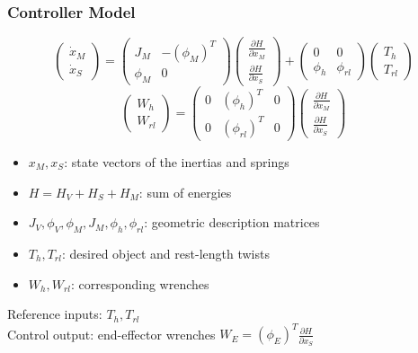 \documentclass[student]{ITRslides}
\begin{document}
\begin{frame}
	\frametitle{Controller Model} \[
	\begin{pmatrix}	\dot{x}_M \\ \dot{x}_S\end{pmatrix} = 
	\begin{pmatrix}J_M & -(\phi_M)^T\\ \phi_M & 0 \end{pmatrix} 
	\begin{pmatrix}\frac{\partial H}{\partial x_M} \\ \frac{\partial H}{\partial x_S}\end{pmatrix}
	+ \begin{pmatrix} 0 & 0 \\ \phi_h & \phi_{rl} \end{pmatrix}
	\begin{pmatrix}
	T_h \\ T_{rl}
	\end{pmatrix}\]
	\[\begin{pmatrix} W_h \\ W_{rl} \end{pmatrix} = 
	\begin{pmatrix}0 & (\phi_h)^T & 0 \\ 0 & (\phi_{rl})^T & 0
\end{pmatrix}\begin{pmatrix}\frac{\partial H}{\partial x_M}\\\frac{\partial H}{\partial x_S}\end{pmatrix} \]
\begin{itemize}


\item $ x_M,x_S $: state vectors of the inertias and springs
\item $H = H_V + H_S + H_M$: sum of energies
\item $J_V,\phi_V,\phi_M,J_M,\phi_h,\phi_{rl}$: geometric description matrices
\item $T_h,T_{rl}$: desired object and rest-length twists
 \item $W_h,W_{rl}$: corresponding wrenches
\end{itemize}
\vspace{10pt}
Reference inputs: $T_h,T_{rl}$\\
Control output: end-effector wrenches $W_E = (\phi_E)^T \frac{\partial H}{\partial x_S} $
	


\end{frame}
\end{document}
